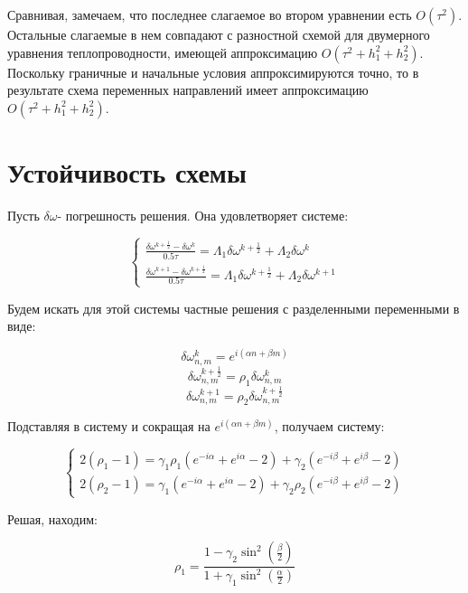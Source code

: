 \documentclass[12pt]{article}
\begin{document}
		Сравнивая, замечаем, что последнее слагаемое во втором уравнении есть $O(\tau^2)$. Остальные слагаемые в нем совпадают с разностной схемой для двумерного уравнения теплопроводности, имеющей аппроксимацию $O(\tau^2 + h_1^2 + h_2^2)$. Поскольку граничные и начальные условия аппроксимируются точно, то в результате схема переменных направлений имеет аппроксимацию $O(\tau^2 + h_1^2 + h_2^2)$.
		
	\section{Устойчивость схемы}
		Пусть $\delta \omega$- погрешность решения. Она удовлетворяет системе:
		
		\begin{equation}
			\begin{cases}
				\frac{\delta \omega^{k+\frac{1}{2}} - \delta \omega^k}{0.5\tau} = \Lambda_1 \delta\omega^{k + \frac{1}{2}} + \Lambda_2 \delta\omega^k\\
										
				\frac{ \delta\omega^{k+1} - \delta\omega^{k+\frac{1}{2}}}{0.5\tau} = \Lambda_1 \delta\omega^{k + \frac{1}{2}} + \Lambda_2 \delta\omega^{k+1}
			\end{cases}
		\end{equation}
		
		Будем искать для этой системы частные решения с разделенными переменными в виде:
		
		$$\delta\omega^k_{n,m} = e^{i(\alpha n + \beta m)}$$
		$$\delta\omega^{k+\frac{1}{2}}_{n,m} = \rho_1 \delta\omega^k_{n,m}$$
		$$\delta\omega^{k+1}_{n,m} = \rho_2\delta\omega^{k+\frac{1}{2}}_{n,m}$$
		
		Подставляя в систему и сокращая на $e^{i(\alpha n + \beta m)}$, получаем систему:
		
		\begin{equation}
			\begin{cases}
				2(\rho_1 -1) = \gamma_1 \rho_1 (e^{-i\alpha} + e^{i\alpha} -2) + \gamma_2 (e^{-i\beta} + e^{i\beta} -2) \\
				2(\rho_2 -1) = \gamma_1 (e^{-i\alpha} + e^{i\alpha} -2) + \gamma_2 \rho_2 (e^{-i\beta} + e^{i\beta} -2)
			\end{cases}
		\end{equation}
		
		Решая, находим:
		
		$$\rho_1 = \frac{1 - \gamma_2 \sin^2 \left( \frac{\beta}{2} \right)}{1 + \gamma_1 \sin^2 \left( \frac{\alpha}{2} \right)}$$
		
\end{document}
